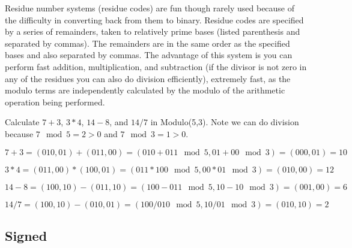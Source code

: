 Residue number systems (residue codes) are fun though rarely used because of the difficulty in converting back from them to binary.  Residue codes are specified by a series of remainders, taken to relatively prime bases (listed parenthesis and separated by commas).  The remainders are in the same order as the specified bases and also separated by commas.  The advantage of this system is you can perform fast addition, multiplication, and subtraction (if the divisor is not zero in any of the residues you can also do division efficiently), extremely fast, as the modulo terms are independently calculated by the modulo of the arithmetic operation being performed.

\begin{example}
Calculate $7+3$, $3*4$, $14-8$, and $14/7$ in Modulo(5,3).  Note we can do division because $7\mod 5=2>0$ and $7\mod 3 =1>0$.

{\color{ans}
$7+3 = (010,01) + (011,00) = (010+011 \mod 5,01+00 \mod 3) = (000,01) = 10$

$3*4 = (011,00)*(100,01) = (011*100 \mod 5, 00*01 \mod 3) = (010,00) = 12$

$14-8 = (100,10)-(011,10) = (100-011 \mod 5, 10 -10 \mod 3) = (001,00) = 6$

$14/7 = (100,10)-(010,01) = (100/010 \mod 5, 10/01 \mod 3) = (010,10) = 2$
}
\end{example}

\subsection{Signed}


